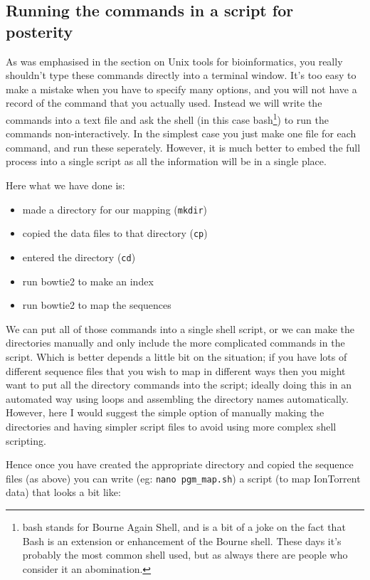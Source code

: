 \documentclass[11pt]{article}
\begin{document}
\subsection{Running the commands in a script for posterity}
\label{sec-1-2}
As was emphasised in the section on Unix tools for bioinformatics, you
really shouldn't type these commands directly into a terminal
window. It's too easy to make a mistake when you have to specify many
options, and you will not have a record of the command that you
actually used. Instead we will write the commands into a text file and
ask the shell (in this case bash\footnote{bash stands for Bourne Again Shell, and is a bit of a joke
on the fact that Bash is an extension or enhancement of the Bourne
shell. These days it's probably the most common shell used, but as
always there are people who consider it an abomination.}) to run the commands
non-interactively. In the simplest case you just make one file for
each command, and run these seperately. However, it is much better to
embed the full process into a single script as all the information
will be in a single place. 

Here what we have done is:
\begin{itemize}
\item made a directory for our mapping (\texttt{mkdir})
\item copied the data files to that directory (\texttt{cp})
\item entered the directory (\texttt{cd})
\item run bowtie2 to make an index
\item run bowtie2 to map the sequences
\end{itemize}

We can put all of those commands into a single shell script, or we can make
the directories manually and only include the more complicated commands in
the script. Which is better depends a little bit on the situation; if you
have lots of different sequence files that you wish to map in different ways
then you might want to put all the directory commands into the script;
ideally doing this in an automated way using loops and
assembling the directory names automatically. However, here I would suggest
the simple option of manually making the directories and having simpler
script files to avoid using more complex shell scripting.

Hence once you have created the appropriate directory and copied the sequence
files (as above) you can write (eg: \texttt{nano pgm\_map.sh}) a script (to map
IonTorrent data) that looks a bit like:
\end{document}
